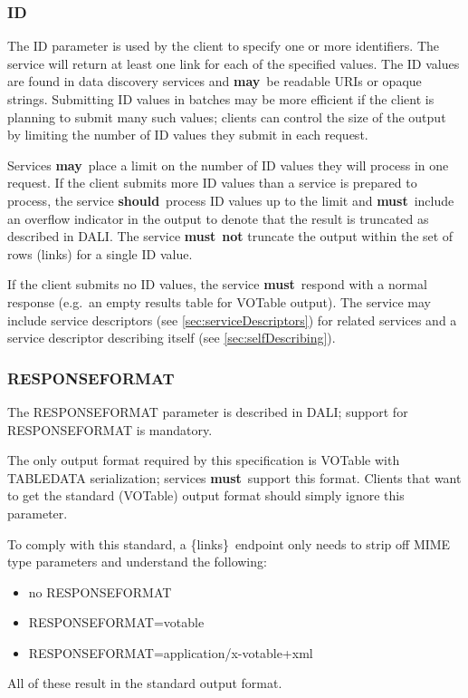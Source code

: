\documentclass[11pt,a4paper]{ivoa}
\newcommand{\blinks}{\{links\}}
\newcommand{\rfcmust}{\textbf{must}}
\newcommand{\rfcshould}{\textbf{should}}
\newcommand{\rfcmay}{\textbf{may}}
\begin{document}
\subsubsection{ID}
\label{sec:resourceId}

The ID parameter is used by the client to specify one or more
identifiers. The service will return at least one link for each of the
specified values. The ID values are found in data discovery services
and \rfcmay\ be readable URIs or opaque strings. Submitting ID values in batches
may be more efficient if the client is planning to submit many such values;
clients can control the size of the output by limiting the number of ID values 
they submit in each request.

Services \rfcmay\ place a limit on the number of ID values they will process in one 
request. If the client submits more ID values than a service is prepared to
process, the service \rfcshould\ process ID values up to the limit and
\rfcmust\ include an overflow indicator in the output to denote that
the result is truncated as described in DALI.
The service \rfcmust\ \textbf{not} truncate the output within the set of rows
(links) for a single ID value.

If the client submits no ID values, the service \rfcmust\ respond with a
normal response (e.g.\ an empty results table for VOTable output).
The service may include service descriptors
(see \ref{sec:serviceDescriptors})
for related services and a service descriptor describing itself
(see \ref{sec:selfDescribing}).


\subsubsection{RESPONSEFORMAT}
\label{sec:responseformat}

The RESPONSEFORMAT parameter is described in DALI;
support for RESPONSEFORMAT is mandatory.

The only output format required by this specification is VOTable with
TABLEDATA serialization; services \rfcmust\ support this format. Clients
that want to get the standard (VOTable) output format should simply
ignore this parameter.

To comply with this standard, a \blinks\ endpoint only needs to strip
off MIME type parameters and understand the following:
\begin{itemize}
  \item no RESPONSEFORMAT
  \item RESPONSEFORMAT=votable
  \item RESPONSEFORMAT=application/x-votable+xml
\end{itemize}
All of these result in the standard output format.
\end{document}

